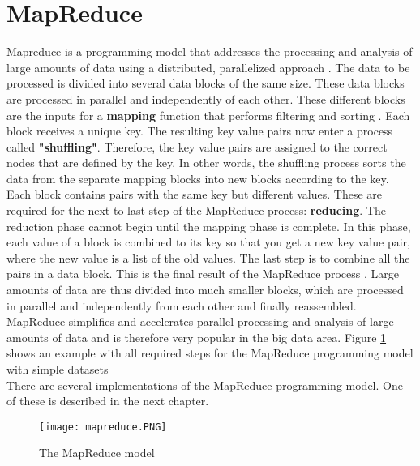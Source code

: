 \section{MapReduce}
\label{mapreduce}
Mapreduce is a programming model that addresses the processing and analysis of large amounts of data using a distributed, parallelized approach \cite[][]{DG04}. The data to be processed is divided into several data blocks of the same size. These data blocks are processed in parallel and independently of each other. These different blocks are the inputs for a \textbf{mapping} function that performs filtering and sorting \cite[][]{BI01}. Each block receives a unique key. The resulting key value pairs now enter a process called \textbf{"shuffling"}. Therefore, the key value pairs are assigned to the correct nodes that are defined by the key. In other words, the shuffling process sorts the data from the separate mapping blocks into new blocks according to the key. Each block contains pairs with the same key but different values. These are required for the next to last step of the MapReduce process: \textbf{reducing}. The reduction phase cannot begin until the mapping phase is complete. In this phase, each value of a block is combined to its key so that you get a new key value pair, where the new value is a list of the old values. The last step is to combine all the pairs in a data block. This is the final result of the MapReduce process \cite[][]{TW15}. Large amounts of data are thus divided into much smaller blocks, which are processed in parallel and independently from each other and finally reassembled. MapReduce simplifies and accelerates parallel processing and analysis of large amounts of data and is therefore very popular in the big data area. Figure \ref{mapreducepic} shows an example with all required steps for the MapReduce programming model with simple datasets
\\
There are several implementations of the MapReduce programming model. One of these is described in the next chapter.
\begin{figure}[H]
	\centering
	\texttt{[image: mapreduce.PNG]}
	\caption[Caption for LOF]{The MapReduce model\footnotemark}
	\label{mapreducepic}
\end{figure}

